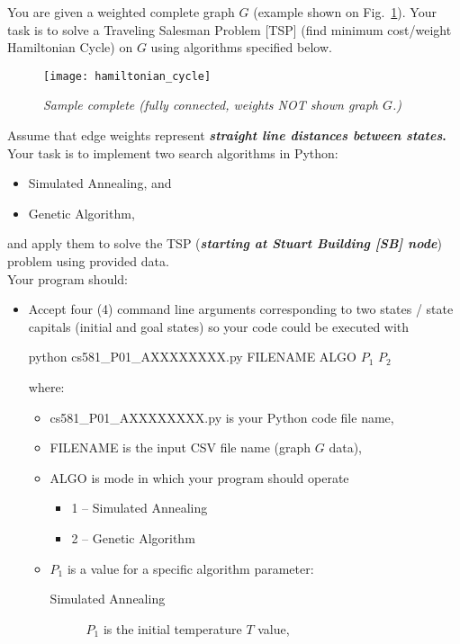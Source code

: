 \documentclass[
	type={Programming},
	assignment={1},
	points={100},
	duedate={Sunday, March 3, 2024, 11:59 CST},
	template=true,
]{cs581homework}
\begin{document}
\begin{problemdescription}
	You are given a weighted complete graph $G$ (example shown on Fig.~\ref{fig:hamiltonian_cycle}).
	Your task is to solve a Traveling Salesman Problem [TSP] (find minimum cost/weight Hamiltonian Cycle) on $G$ using algorithms specified below.

	\begin{figure}[H]
		\centering
		\texttt{[image: hamiltonian\_cycle]}
		\caption{\textit{Sample complete (fully connected, weights NOT shown graph $G$.)}}
		\label{fig:hamiltonian_cycle}
	\end{figure}

	Assume that edge weights represent \textbf{\emph{straight line distances between states}.}\\

	Your task is to implement two search algorithms in Python:
	\begin{itemize}
		\item Simulated Annealing, and
		\item Genetic Algorithm,
	\end{itemize}
	and apply them to solve the TSP (\textbf{\emph{starting at Stuart Building [SB] node}}) problem using provided data.\\
	Your program should:
	\begin{itemize}
		\item Accept four (4) command line arguments corresponding to two states / state capitals (initial and goal states) so your code could be executed with \begin{center} python cs581\_P01\_AXXXXXXXX.py FILENAME ALGO $P_{1}$ $P_{2}$ \end{center}
		where:
		\begin{itemize}
			\item cs581\_P01\_AXXXXXXXX.py is your Python code file name,
			\item FILENAME is the input CSV file name (graph $G$ data),
			\item ALGO is mode in which your program should operate
			\begin{itemize}
				\item 1 -- Simulated Annealing
				\item 2 -- Genetic Algorithm
			\end{itemize}
			\item $P_{1}$ is a value for a specific algorithm parameter:
			\begin{description}
				\item[Simulated Annealing] $P_{1}$ is the initial temperature $T$ value,

\end{description}
\end{itemize}
\end{itemize}
\end{problemdescription}
\end{document}
